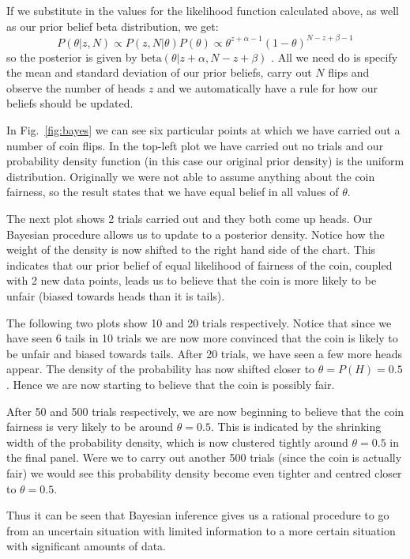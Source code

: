 If we substitute in the values for the likelihood function calculated above, as well as our prior belief beta distribution, we get:
\begin{equation}
  P(\theta|z,N)\propto P(z,N|\theta)P(\theta)\propto \theta^{z+\alpha - 1}(1-\theta)^{N-z+\beta -1} 
\end{equation}
so the posterior is given by $\textrm{beta}(\theta|z+\alpha,N-z+\beta)$ .
All we need do is specify the mean and standard deviation of our prior beliefs, carry out $N$ flips and observe the number of heads $z$ and we automatically have a rule for how our beliefs should be updated.

In Fig.~\ref{fig:bayes} we can see six particular points at which we have carried out a number of coin flips. In the top-left plot we have carried out no trials and our probability density function (in this case our original prior density) is the uniform distribution.
Originally we were not able to assume anything about the coin fairness, so the result states that we have equal belief in all values of $\theta$.

The next plot shows 2 trials carried out and they both come up heads. Our Bayesian procedure allows us to update to a posterior density. Notice how the weight of the density is now shifted to the right hand side of the chart. This indicates that our prior belief of equal likelihood of fairness of the coin, coupled with 2 new data points, leads us to believe that the coin is more likely to be unfair (biased towards heads than it is tails).

The following two plots show 10 and 20 trials respectively. Notice that since we have seen 6 tails in 10 trials we are now more convinced that the coin is likely to be unfair and biased towards tails. After 20 trials, we have seen a few more heads appear. The density of the probability has now shifted closer to $\theta = P(H) = 0.5$. Hence we are now starting to believe that the coin is possibly fair.

After 50 and 500 trials respectively, we are now beginning to believe that the coin fairness is very likely to be around $\theta=0.5$. This is indicated by the shrinking width of the probability density, which is now clustered tightly around $\theta=0.5$ in the final panel. Were we to carry out another 500 trials (since the coin is actually fair) we would see this probability density become even tighter and centred closer to $\theta=0.5$.

Thus it can be seen that Bayesian inference gives us a rational procedure to go from an uncertain situation with limited information to a more certain situation with significant amounts of data.

